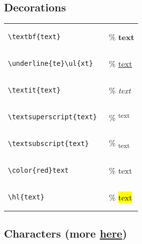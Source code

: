 \subsection*{Decorations}
\begin{tabular}{l l}
\begin{lstlisting}
\textbf{text} 
\end{lstlisting}
& \% \textbf{text}  \\

\begin{lstlisting}
\underline{te}\ul{xt}
\end{lstlisting}
& \% \href{https://alexwlchan.net/2017/10/latex-underlines/}{\underline{te}\ul{xt}} \\

\begin{lstlisting}
\textit{text} 
\end{lstlisting}
& \% \textit{text} \\


\begin{lstlisting}
\textsuperscript{text} 
\end{lstlisting}
& \% \textsuperscript{text} \\

\begin{lstlisting}
\textsubscript{text} 
\end{lstlisting}
& \% \textsubscript{text} \\

\begin{lstlisting}
\color{red}text
\end{lstlisting}
& \% \color{red}text \\

\begin{lstlisting}
\hl{text}
\end{lstlisting}
& \% \hl{text} \\

\end{tabular}

\subsection*{Characters (more \href{http://tug.ctan.org/info/symbols/comprehensive/symbols-a4.pdf}{here})}

